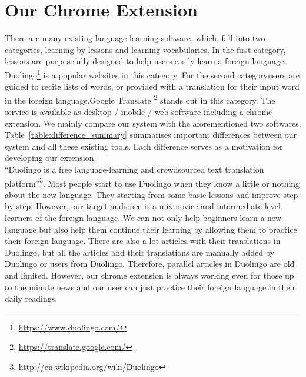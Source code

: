 \section{Our Chrome Extension}
There are many existing language learning software, which, fall into two categories, learning by  
lessons and learning vocabularies. In the first category, 
lessons are purposefully designed to help users easily learn a foreign language.
Duolingo\footnote{\url{https://www.duolingo.com/}} is a popular websites in this category. 
For the second categoryusers are guided to recite lists of words, or provided with a translation for their input word in the foreign language.Google Translate \footnote{\url{https://translate.google.com/}} stands out in this category. The service is available as desktop / mobile / web software including a chrome extension. We mainly compare our system  with the aforementioned two softwares.
Table~\ref{table:difference_summary} summarises important differences between 
our system and all these existing tools. Each difference serves as a motivation 
for developing our extension.
\\
``Duolingo is a free language-learning and crowdsourced text translation 
platform''\footnote{\url{http://en.wikipedia.org/wiki/Duolingo}}.
Most people start to use Duolingo when they know a little or nothing about 
the new language. They starting from some basic lessons and improve step by step.
However, our target audience 
is a mix novice and intermediate level learners of the foreign language. 
We can not only help beginners learn 
a new language but also help them continue their learning by allowing them to practice 
their foreign language. There are also a lot articles with their translations in 
Duolingo, but all the articles and their translations are manually added by 
Duolingo or users from Duolingo. Therefore, parallel articles in Duolingo are old and 
limited. However, our chrome extension is always working even for those up to the 
minute news and our user can just practice their foreign language in their daily 
readings.

